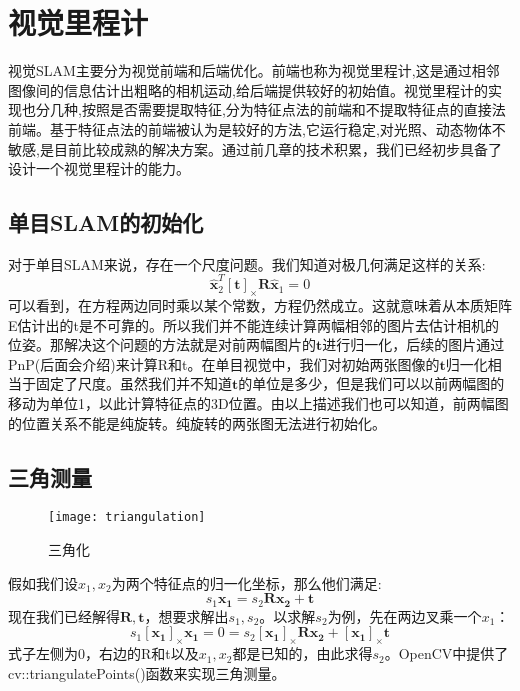 \chapter{视觉里程计}
视觉SLAM主要分为视觉前端和后端优化。前端也称为视觉里程计,这是通过相邻图像间的信息估计出粗略的相机运动,给后端提供较好的初始值。视觉里程计的实现也分几种,按照是否需要提取特征,分为特征点法的前端和不提取特征点的直接法前端。基于特征点法的前端被认为是较好的方法,它运行稳定,对光照、动态物体不敏感,是目前比较成熟的解决方案。通过前几章的技术积累，我们已经初步具备了设计一个视觉里程计的能力。\par
\section{单目SLAM的初始化}
对于单目SLAM来说，存在一个尺度问题。我们知道对极几何满足这样的关系:
\begin{equation}
\hat{\boldsymbol{x}}_2^T\left[\boldsymbol{t}\right]_{\times}\boldsymbol{R}\hat{\boldsymbol{x}}_1=0
\end{equation}
可以看到，在方程两边同时乘以某个常数，方程仍然成立。这就意味着从本质矩阵E估计出的t是不可靠的。所以我们并不能连续计算两幅相邻的图片去估计相机的位姿。那解决这个问题的方法就是对前两幅图片的$\boldsymbol{t}$进行归一化，后续的图片通过PnP(后面会介绍)来计算R和t。在单目视觉中，我们对初始两张图像的$\boldsymbol{t}$归一化相当于固定了尺度。虽然我们并不知道$\boldsymbol{t}$的单位是多少，但是我们可以以前两幅图的移动为单位1，以此计算特征点的3D位置。由以上描述我们也可以知道，前两幅图的位置关系不能是纯旋转。纯旋转的两张图无法进行初始化。
\section{三角测量}
\begin{figure}[H]
	\centering
	\texttt{[image: triangulation]}
	\caption{三角化}
	\label{fig:triangulation}
\end{figure}
假如我们设$x_1,x_2$为两个特征点的归一化坐标，那么他们满足:
\begin{equation}
	s_1\boldsymbol{x_1}=s_2\boldsymbol{Rx_2}+\boldsymbol{t}
\end{equation}
现在我们已经解得$\boldsymbol{R},\boldsymbol{t}$，想要求解出$s_1,s_2$。以求解$s_2$为例，先在两边叉乘一个$x_1$：
\begin{equation}
s_1\left[\boldsymbol{x_1}\right]_{\times}\boldsymbol{x_1}=0=s_2\left[\boldsymbol{x_1}\right]_{\times}\boldsymbol{Rx_2}+\left[\boldsymbol{x_1}\right]_{\times}\boldsymbol{t}
\end{equation}
式子左侧为0，右边的R和t以及$x_1,x_2$都是已知的，由此求得$s_2$。OpenCV中提供了cv::triangulatePoints()函数来实现三角测量。
